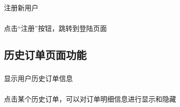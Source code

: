\subsubsection*{}
注册新用户
\subsubsection*{}
点击“注册”按钮，跳转到登陆页面

\subsection{历史订单页面功能}
\subsubsection*{}
显示用户历史订单信息
\subsubsection*{}
点击某个历史订单，可以对订单明细信息进行显示和隐藏

